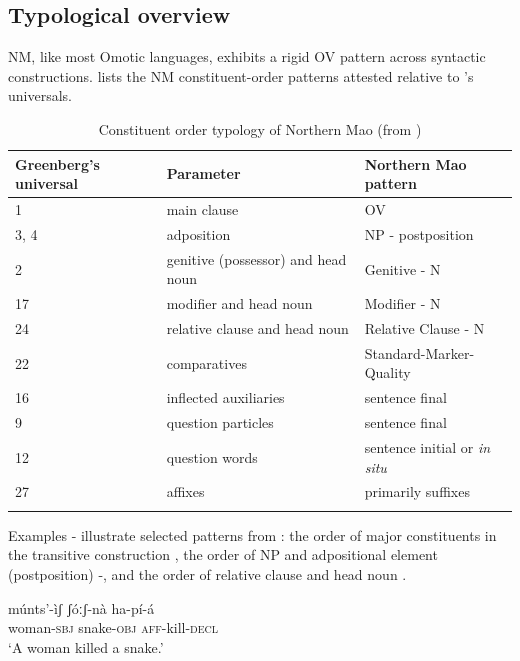 \documentclass[output=paper]{langsci/langscibook}
\begin{document}
\subsection{Typological overview}\label{sec:mahland:1.1}

NM, like most Omotic languages, exhibits a rigid OV pattern across syntactic constructions.  lists the NM constituent-order patterns attested relative to \cite{Greenberg1963}'s universals. 

\begin{table}
\caption{Constituent order typology of Northern Mao (from \citealt[48]{Ahland2012})}
\label{tab:mahland:1}
  	\centering
\begin{tabularx}{\textwidth}{XXX}
\lsptoprule
Greenberg's universal & Parameter & Northern Mao pattern\\
\midrule
1 & main clause & OV\\
3, 4 & adposition & NP - postposition \\
2 & genitive (possessor) and head noun & Genitive - N\\
17 & modifier and head noun & Modifier - N\\
24 &  relative clause\index{subordination!relative clauses} and head noun & Relative Clause - N\\
22 & comparatives & Standard-Marker-Quality\\
16 & inflected auxiliaries & sentence final\\
9 & question particles & sentence final\\
12 & question words & sentence initial or \textit{in situ}\\
27 & affixes & primarily suffixes\\
\lspbottomrule
\end{tabularx}
\end{table}

Examples - illustrate selected patterns from : the order of major constituents in the transitive construction , the order of NP and adpositional element (postposition) -, and the order of relative clause and head noun . 

\ea\label{ex:mahland:1}
\gll  múnts'-ìʃ       ʃóːʃ-nà          ha-pí-{\downstep}á \\
woman\textsc{{}-sbj}    snake\textsc{{}-obj}     \textsc{aff}-kill\textsc{{}-decl} \\
\glt `A woman killed a snake.'
\z        
\end{document}
